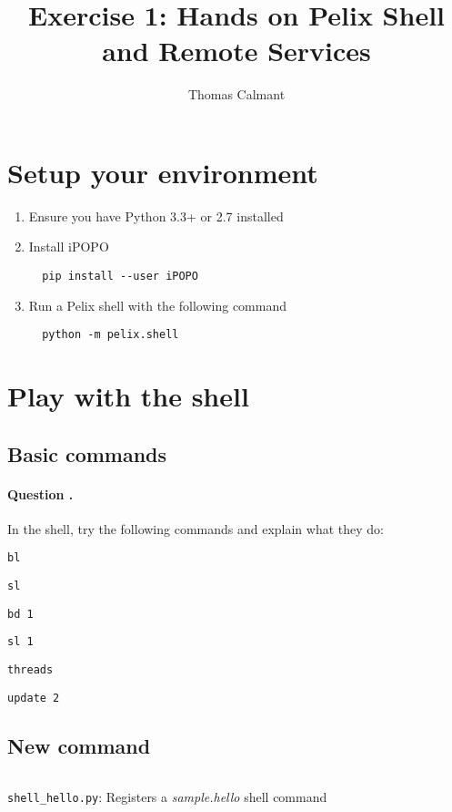 \documentclass[a4paper, 12pt]{article}
\title{Exercise 1: Hands on Pelix Shell and Remote Services}
\author{Thomas Calmant}
\date{}
\newcounter{question}
\newcommand\Question{%
  \stepcounter{question}%
  \paragraph{\hspace{2ex} Question \thequestion.}
}
\let\tempone\itemize
\let\temptwo\enditemize
\renewenvironment{itemize}{\tempone\addtolength{\itemsep}{-.5em}}{\temptwo}
\begin{document}
\maketitle

\section{Setup your environment}

\begin{enumerate}
\item Ensure you have Python 3.3+ or 2.7 installed
\item Install iPOPO
\begin{verbatim}
  pip install --user iPOPO
\end{verbatim}
\item Run a Pelix shell with the following command
\begin{verbatim}
  python -m pelix.shell
\end{verbatim}
\end{enumerate}

\section{Play with the shell}

\subsection{Basic commands}

\Question In the shell, try the following commands and explain what they do:
\begin{itemize}
\item \texttt{bl}
\item \texttt{sl}
\item \texttt{bd 1}
\item \texttt{sl 1}
\item \texttt{threads}
\item \texttt{update 2}
\end{itemize}

\subsection{New command}

\begin{listing}[ht]
\inputminted[fontsize=\footnotesize, frame=lines, framesep=2mm, baselinestretch=1.2, bgcolor=LightGray, linenos]{python}{../shell_hello.py}
\caption{\texttt{shell\_hello.py}: Registers a \textit{sample.hello} shell command}
\label{code:shell_hello}
\end{listing}
\end{document}
